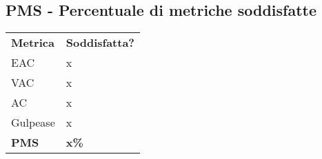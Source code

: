 \subsection{PMS - Percentuale di metriche soddisfatte}
%
\begin{longtable}{ >{\centering}p{} >{\centering}p{}}
	\rowcolorhead
	\textbf{\color{white}Metrica} 
	& \textbf{\color{white}Soddisfatta?} 
	\tabularnewline %
		
	EAC
	& x
	\tabularnewline %
	VAC
	& x
	\tabularnewline %
	AC
	& x
	\tabularnewline %
	Gulpease
	& x
	\tabularnewline %
	\textbf{PMS}
	& \textbf{x\%}
	\tabularnewline %
\end{longtable}